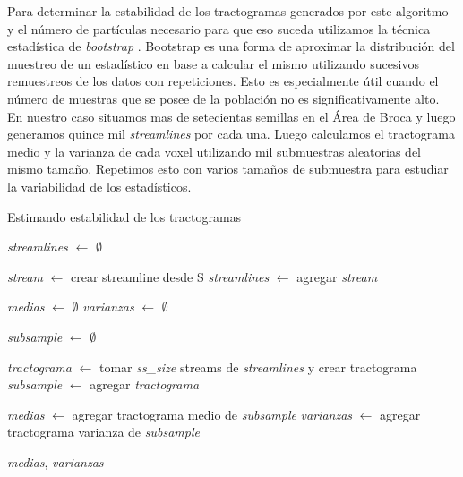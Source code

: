 Para determinar la estabilidad de los tractogramas generados por este algoritmo
y el n\'umero de part\'iculas necesario para que eso suceda utilizamos la t\'ecnica
estad\'istica de \textit{bootstrap} \cite{Efron1982}. Bootstrap es una forma de
aproximar la distribuci\'on del muestreo de un estad\'istico en base a calcular
el mismo utilizando sucesivos remuestreos de los datos con repeticiones. Esto es
especialmente \'util cuando el n\'umero de muestras que se posee de la poblaci\'on
no es significativamente alto. \\

En nuestro caso situamos mas de setecientas semillas en el \'Area de Broca y luego
generamos quince mil \textit{streamlines} por cada una. Luego calculamos el 
tractograma medio y la varianza de cada voxel utilizando mil submuestras aleatorias
del mismo tama\~no. Repetimos esto con varios tama\~nos de submuestra para
estudiar la variabilidad de los estad\'isticos.\\

\begin{algorithm}
\caption{Estimando estabilidad de los tractogramas}\label{alg:localtracking}
\begin{algorithmic}[1]


\State \emph{streamlines} $\gets$ $\emptyset$

    \State \emph{stream} $\gets$ crear streamline desde S 
    \State \emph{streamlines} $\gets$ agregar \emph{stream}
\EndLoop

\State \emph{medias} $\gets$ $\emptyset$
\State \emph{varianzas} $\gets$ $\emptyset$


    \State \emph{subsample} $\gets$ $\emptyset$

        \State \emph{tractograma} $\gets$ tomar \emph{ss\_size} streams de \emph{streamlines} y crear tractograma
        \State \emph{subsample} $\gets$ agregar \emph{tractograma} 
    \EndLoop
    
    \State \emph{medias} $\gets$ agregar tractograma medio de \emph{subsample}
    \State \emph{varianzas} $\gets$ agregar tractograma varianza de \emph{subsample}
\EndFor

\State \Return \emph{medias}, \emph{varianzas} 
 
\EndProcedure
\end{algorithmic}
\end{algorithm}



